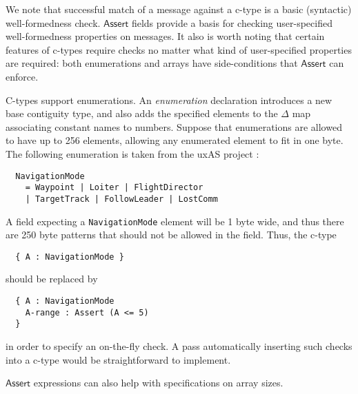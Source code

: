 \documentclass[svgnames]{llncs}
\newcommand{\konst}[1]{\ensuremath{\mathsf{#1}}}
\begin{document}

We note that successful match of a message against a c-type is a basic
(syntactic) well-formedness check. \konst{Assert} fields provide a
basis for checking user-specified well-formedness properties on
messages. It also is worth noting that certain features of c-types
require checks no matter what kind of user-specified properties are
required: both enumerations and arrays have side-conditions that
\konst{Assert} can enforce.

\begin{example}
C-types support enumerations. An \emph{enumeration} declaration
introduces a new base contiguity type, and also adds the specified
elements to the $\Delta$ map associating constant names to numbers.
Suppose that enumerations are allowed to have up to 256 elements,
allowing any enumerated element to fit in one byte. The following
enumeration is taken from the uxAS project \cite{}:
\begin{verbatim}
  NavigationMode
    = Waypoint | Loiter | FlightDirector
    | TargetTrack | FollowLeader | LostComm
\end{verbatim}

A field expecting a \verb+NavigationMode+ element will be 1 byte wide,
and thus there are 250 byte patterns that should not be allowed in the
field. Thus, the c-type

\begin{verbatim}
  { A : NavigationMode }
\end{verbatim}

should be replaced by

\begin{verbatim}
  { A : NavigationMode
    A-range : Assert (A <= 5)
  }
\end{verbatim}

\noindent in order to specify an on-the-fly check. A pass automatically
inserting such checks into a c-type would be straightforward to
implement.

\end{example}

\noindent \konst{Assert} expressions can also help with specifications
on array sizes.
\end{document}
